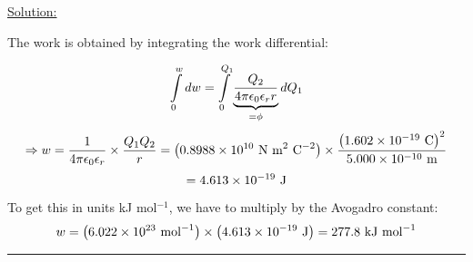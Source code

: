 \noindent
\underline{Solution:}

The work is obtained by integrating the work differential:

$$\int\limits_0^wdw = \int\limits_0^{Q_1}\mathop {\underbrace{\frac{Q_2}{4\pi\epsilon_0\epsilon_rr}}}\limits_{=\phi}dQ_1$$
$$\Rightarrow w = \frac{1}{4\pi\epsilon_0\epsilon_r}\times\frac{Q_1Q_2}{r} = \left(0.8988\times 10^{10}\textnormal{ N m}^2\textnormal{ C}^{-2}\right)\times\frac{\left(1.602\times 10^{-19}\textnormal{ C}\right)^2}{5.000\times 10^{-10}\textnormal{ m}}$$
$$= 4.613\times 10^{-19}\textnormal{ J}$$

To get this in units kJ mol$^{-1}$, we have to multiply by the Avogadro constant:
$$w = \left(6.022\times 10^{23}\textnormal{ mol}^{-1}\right)\times\left(4.613\times 10^{-19}\textnormal{ J}\right) = 277.8\textnormal{ kJ mol}^{-1}$$

\hrule\vspace{0.5cm}
